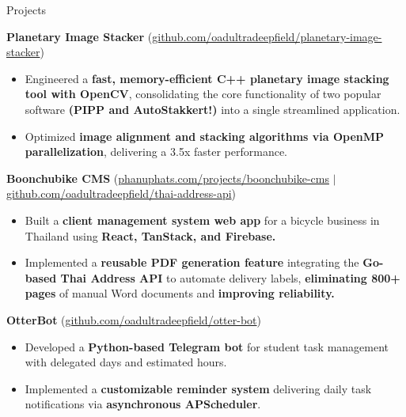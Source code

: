 \documentclass{phanuphat_srisukhawasu_resume} %
\begin{document}

\begin{rSection}{Projects}

  \textbf{Planetary Image Stacker} (\href{https://github.com/oadultradeepfield/planetary-image-stacker}{github.com/oadultradeepfield/planetary-image-stacker})
  \begin{itemize}
    \item Engineered a \textbf{fast, memory-efficient C++ planetary image stacking tool with OpenCV}, consolidating the core functionality of two popular software \textbf{(PIPP and AutoStakkert!)} into a single streamlined application.
    \item Optimized \textbf{image alignment and stacking algorithms via OpenMP parallelization}, delivering a 3.5x faster performance.
  \end{itemize}

  \textbf{Boonchubike CMS} (\href{https://phanuphats.com/projects/boonchubike-cms}{phanuphats.com/projects/boonchubike-cms} $|$ \href{https://github.com/oadultradeepfield/thai-address-api}{github.com/oadultradeepfield/thai-address-api})
  \begin{itemize}
    \item Built a \textbf{client management system web app} for a bicycle business in Thailand using \textbf{React, TanStack, and Firebase.}
    \item Implemented a \textbf{reusable PDF generation feature} integrating the \textbf{Go-based Thai Address API} to automate delivery labels, \textbf{eliminating 800+ pages} of manual Word documents and \textbf{improving reliability.}
  \end{itemize}

  \textbf{OtterBot} (\href{https://github.com/oadultradeepfield/otter-bot}{github.com/oadultradeepfield/otter-bot})
  \begin{itemize}
    \item Developed a \textbf{Python-based Telegram bot} for student task management with delegated days and estimated hours.
    \item Implemented a \textbf{customizable reminder system} delivering daily task notifications via \textbf{asynchronous APScheduler}.
  \end{itemize}

\end{rSection}
\end{document}
